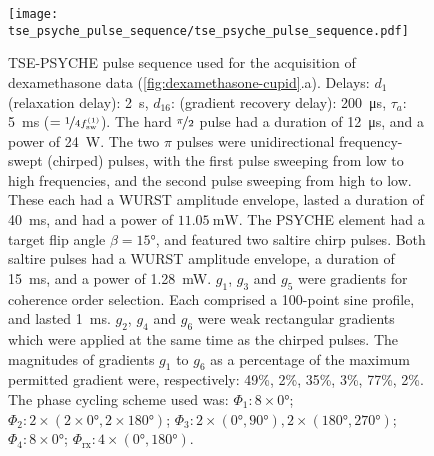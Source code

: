 \begin{figure}[H]
    \centering
    \texttt{[image: tse\_psyche\_pulse\_sequence/tse\_psyche\_pulse\_sequence.pdf]}
    \caption[
    \acs{TSE-PSYCHE} pulse sequence used for the acquisition of dexamethasone data.
    ]{
        \acs{TSE-PSYCHE} pulse sequence used for the acquisition of dexamethasone
        data (\cref{fig:dexamethasone-cupid}.a).
        Delays:
        $d_1$ (relaxation delay): \qty{2}{\second},
        $d_{16}$: (gradient recovery delay): \qty{200}{\micro\second},
        $\tau_a$: \qty{5}{\milli\second} ($= \nicefrac{1}{4
        f_{\text{sw}}^{(1)}}$).
        The hard $\nicefrac{\pi}{2}$ pulse had a duration of
        \qty{12}{\micro\second}, and a power of \qty{24}{\watt}.
        The two $\pi$ pulses were unidirectional frequency-swept (chirped) pulses,
        with the first pulse sweeping from low to high frequencies, and the second
        pulse sweeping from high to low. These each had a \acs{WURST} amplitude
        envelope, lasted a duration of \qty{40}{\milli\second}, and had a power
        of $\qty{11.05}{\milli\watt}$.
        The \ac{PSYCHE} element had a target flip angle $\beta = \ang{15}$, and
        featured two saltire chirp pulses. Both saltire pulses had a
        \ac{WURST} amplitude envelope, a duration of \qty{15}{\milli\second},
        and a power of
        \qty{1.28}{\milli\watt}.
        $g_1$, $g_3$ and $g_5$ were gradients for coherence order selection.
        Each comprised a 100-point sine profile, and lasted
        \qty{1}{\milli\second}. $g_2$, $g_4$ and $g_6$ were weak rectangular gradients
        which were applied at the same time as the chirped pulses.
        The magnitudes of gradients $g_1$ to  $g_6$ as a percentage of the
        maximum permitted gradient were, respectively:
        49\%, 2\%, 35\%, 3\%, 77\%, 2\%.
        The phase cycling scheme used was:
        $\Phi_1: 8 \times \ang{0}$;
        $\Phi_2: 2 \times (2 \times \ang{0}, 2 \times \ang{180})$;
        $\Phi_3: 2 \times (\ang{0}, \ang{90}), 2 \times (\ang{180}, \ang{270})$;
        $\Phi_4: 8 \times \ang{0}$;
        $\Phi_{\text{rx}}: 4 \times (\ang{0}, \ang{180})$.
    }
    \label{fig:tse_psyche}
\end{figure}

